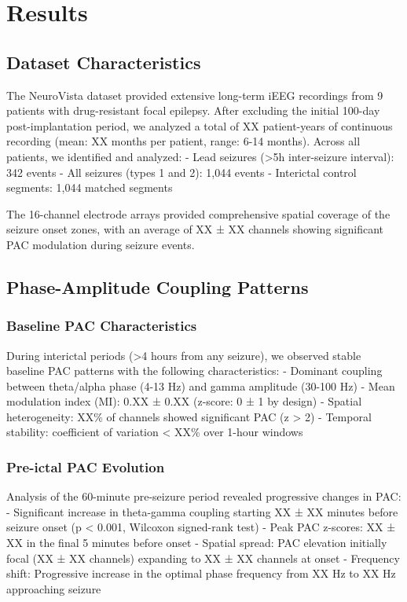 \section{Results}

\subsection{Dataset Characteristics}
The NeuroVista dataset provided extensive long-term iEEG recordings from 9 patients with drug-resistant focal epilepsy. After excluding the initial 100-day post-implantation period, we analyzed a total of XX patient-years of continuous recording (mean: XX months per patient, range: 6-14 months). Across all patients, we identified and analyzed:
- Lead seizures (>5h inter-seizure interval): 342 events
- All seizures (types 1 and 2): 1,044 events  
- Interictal control segments: 1,044 matched segments

The 16-channel electrode arrays provided comprehensive spatial coverage of the seizure onset zones, with an average of XX ± XX channels showing significant PAC modulation during seizure events.

\subsection{Phase-Amplitude Coupling Patterns}

\subsubsection{Baseline PAC Characteristics}
During interictal periods (>4 hours from any seizure), we observed stable baseline PAC patterns with the following characteristics:
- Dominant coupling between theta/alpha phase (4-13 Hz) and gamma amplitude (30-100 Hz)
- Mean modulation index (MI): 0.XX ± 0.XX (z-score: 0 ± 1 by design)
- Spatial heterogeneity: XX\% of channels showed significant PAC (z > 2)
- Temporal stability: coefficient of variation < XX\% over 1-hour windows

\subsubsection{Pre-ictal PAC Evolution}
Analysis of the 60-minute pre-seizure period revealed progressive changes in PAC:
- Significant increase in theta-gamma coupling starting XX ± XX minutes before seizure onset (p < 0.001, Wilcoxon signed-rank test)
- Peak PAC z-scores: XX ± XX in the final 5 minutes before onset
- Spatial spread: PAC elevation initially focal (XX ± XX channels) expanding to XX ± XX channels at onset
- Frequency shift: Progressive increase in the optimal phase frequency from XX Hz to XX Hz approaching seizure

